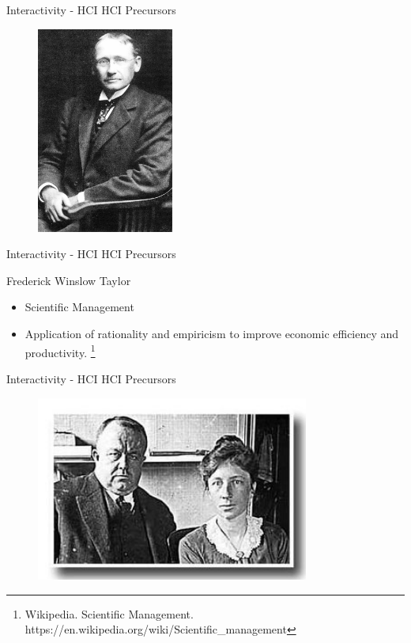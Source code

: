 \documentclass{beamer}
\newcommand\blfootnote[1]{%
  \begingroup
  \renewcommand\thefootnote{}\footnote{#1}%
  \addtocounter{footnote}{-1}%
  \endgroup
}
\begin{document}
\begin{frame}{Interactivity - HCI} 
    HCI Precursors
    \begin{figure}[h]
        \includegraphics[width=0.4\textwidth]{taylor.jpg}
    \end{figure}
\end{frame}

\begin{frame}{Interactivity - HCI} 
    HCI Precursors\\
    \vspace{5mm}

    Frederick Winslow Taylor\\ 
    \begin{itemize}
        \item Scientific Management
        \item Application of rationality and empiricism to improve economic efficiency and productivity.\blfootnote{Wikipedia. Scientific Management. https://en.wikipedia.org/wiki/Scientific\_management}
    \end{itemize}
\end{frame}

\begin{frame}{Interactivity - HCI} 
    HCI Precursors
    \begin{figure}[h]
        \includegraphics[width=0.8\textwidth]{gilbreth.jpg}
    \end{figure}
\end{frame}
\end{document}
